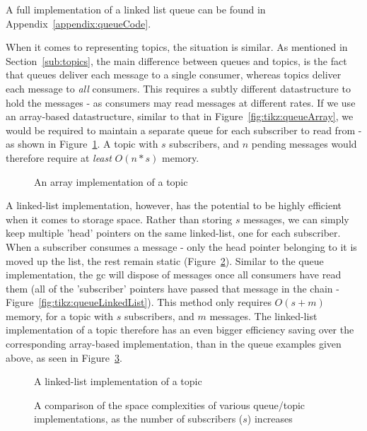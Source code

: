 A full implementation of a linked list queue can be found in
Appendix~\ref{appendix:queueCode}.


When it comes to representing topics, the situation is similar. As mentioned in
Section~\ref{sub:topics}, the main difference between queues and topics, is the
fact that queues deliver each message to a single consumer, whereas topics
deliver each message to \emph{all} consumers. This requires a subtly different
datastructure to hold the messages - as consumers may read messages at different
rates. If we use an array-based datastructure, similar to that in
Figure~\ref{fig:tikz:queueArray}, we would be required to maintain a separate
queue for each subscriber to read from - as shown in
Figure~\ref{fig:tikz:arrayTopic}. A topic with $s$ subscribers, and $n$ pending
messages would therefore require at \emph{least} $O(n * s)$ memory.

\begin{figure}[H]
  \centering
  
  \caption{An array implementation of a topic}
  \label{fig:tikz:arrayTopic}
\end{figure}

A linked-list implementation, however, has the potential to be highly efficient
when it comes to storage space. Rather than storing $s$ messages, we can simply
keep multiple 'head' pointers on the same linked-list, one for each subscriber.
When a subscriber consumes a message - only the head pointer belonging to it is
moved up the list, the rest remain static
(Figure~\ref{fig:tikz:linkedListTopic}). Similar to the queue implementation,
the \gls{gc} will dispose of messages once all consumers have read them (all of
the 'subscriber' pointers have passed that message in the chain -
Figure~\ref{fig:tikz:queueLinkedList}). This method only requires $O(s + m)$
memory, for a topic with $s$ subscribers, and $m$ messages. The linked-list
implementation of a topic therefore has an even bigger efficiency saving over
the corresponding array-based implementation, than in the queue examples given
above, as seen in Figure~\ref{fig:tikz:implementationSpaceComplexityGraph}.

\begin{figure}[H]
  \centering
  
  \caption{A linked-list implementation of a topic}
  \label{fig:tikz:linkedListTopic}
\end{figure}

\begin{figure}[H]
  \centering
  
  \caption{A comparison of the space complexities of various queue/topic
           implementations, as the number of subscribers ($s$) increases}
  \label{fig:tikz:implementationSpaceComplexityGraph}
\end{figure}

